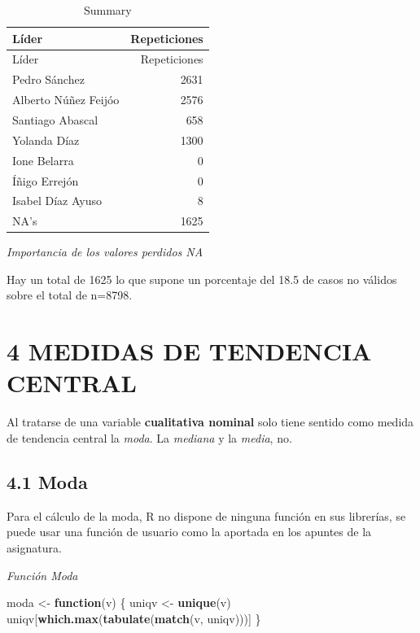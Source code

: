 \documentclass[
  12 pt,
  a4paper,
]{article}
\newenvironment{Shaded}{\begin{snugshade}}{\end{snugshade}}
\newcommand{\ControlFlowTok}[1]{\textcolor[rgb]{0.13,0.29,0.53}{\textbf{#1}}}
\newcommand{\FunctionTok}[1]{\textcolor[rgb]{0.13,0.29,0.53}{\textbf{#1}}}
\newcommand{\NormalTok}[1]{#1}
\newcommand{\OtherTok}[1]{\textcolor[rgb]{0.56,0.35,0.01}{#1}}
\begin{document}
\begin{longtable}[]{@{}lr@{}}
\caption{Summary}\tabularnewline
\toprule\noalign{}
Líder & Repeticiones \\
\midrule\noalign{}
\endfirsthead
\toprule\noalign{}
Líder & Repeticiones \\
\midrule\noalign{}
\endhead
\bottomrule\noalign{}
\endlastfoot
Pedro Sánchez & 2631 \\
Alberto Núñez Feijóo & 2576 \\
Santiago Abascal & 658 \\
Yolanda Díaz & 1300 \\
Ione Belarra & 0 \\
Íñigo Errejón & 0 \\
Isabel Díaz Ayuso & 8 \\
NA's & 1625 \\
\end{longtable}

\emph{Importancia de los valores perdidos NA}

Hay un total de 1625 lo que supone un porcentaje del 18.5 de casos no
válidos sobre el total de n=8798.

\newpage

\hypertarget{medidas-de-tendencia-central}{%
\section{4 MEDIDAS DE TENDENCIA
CENTRAL}\label{medidas-de-tendencia-central}}

Al tratarse de una variable \textbf{cualitativa nominal} solo tiene
sentido como medida de tendencia central la \emph{moda}. La
\emph{mediana} y la \emph{media}, no.

\hypertarget{moda}{%
\subsection{4.1 Moda}\label{moda}}

Para el cálculo de la moda, R no dispone de ninguna función en sus
librerías, se puede usar una función de usuario como la aportada en los
apuntes de la asignatura.

\emph{Función Moda}

\begin{Shaded}
\begin{Highlighting}[]
\NormalTok{moda }\OtherTok{\textless{}{-}} \ControlFlowTok{function}\NormalTok{(v) \{}
\NormalTok{  uniqv }\OtherTok{\textless{}{-}} \FunctionTok{unique}\NormalTok{(v)}
\NormalTok{  uniqv[}\FunctionTok{which.max}\NormalTok{(}\FunctionTok{tabulate}\NormalTok{(}\FunctionTok{match}\NormalTok{(v, uniqv)))]}
\NormalTok{\}}
\end{Highlighting}
\end{Shaded}
\end{document}
